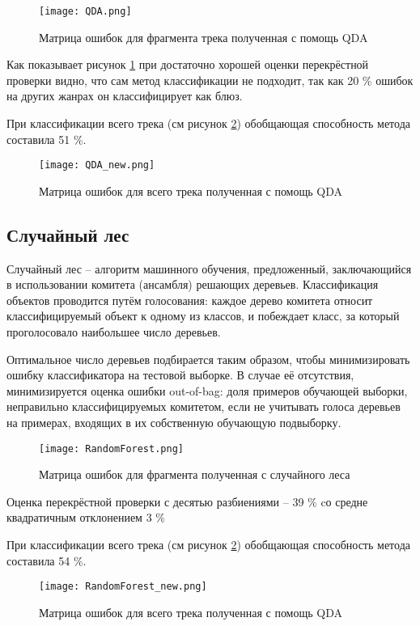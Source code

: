 \begin{figure}[h]
\centering
  \texttt{[image: QDA.png]}
  \caption{Матрица ошибок для фрагмента трека полученная с помощь QDA}
  \label{fig:results:QDA}
\end{figure}

Как показывает рисунок \ref{fig:results:QDA} при достаточно хорошей оценки перекрёстной проверки видно, что сам метод классификации не подходит, так как 20 \% ошибок на других жанрах он классифицирует как блюз. 

При классификации всего трека (см рисунок \ref{fig:results:QDA_new}) обобщающая способность метода составила 51 \%. 
\begin{figure}[h]
\centering
  \texttt{[image: QDA\_new.png]}
  \caption{Матрица ошибок для всего трека полученная с помощь QDA}
  \label{fig:results:QDA_new}
\end{figure}


\subsection{Случайный лес}

Случайный лес -- алгоритм машинного обучения, предложенный, заключающийся в использовании комитета (ансамбля) решающих деревьев. Классификация объектов проводится путём голосования: каждое дерево комитета относит классифицируемый объект к одному из классов, и побеждает класс, за который проголосовало наибольшее число деревьев.

Оптимальное число деревьев подбирается таким образом, чтобы минимизировать ошибку классификатора на тестовой выборке. В случае её отсутствия, минимизируется оценка ошибки out-of-bag: доля примеров обучающей выборки, неправильно классифицируемых комитетом, если не учитывать голоса деревьев на примерах, входящих в их собственную обучающую подвыборку.

\begin{figure}[h]
\centering
  \texttt{[image: RandomForest.png]}
  \caption{Матрица ошибок для фрагмента полученная с случайного леса}
  \label{fig:results:RandomForest}
\end{figure}

Оценка перекрёстной проверки с десятью разбиениями -- 39 \% cо средне квадратичным отклонением 3 \%

При классификации всего трека (см рисунок \ref{fig:results:QDA_new}) обобщающая способность метода составила 54 \%. 
\begin{figure}[h]
\centering
  \texttt{[image: RandomForest\_new.png]}
  \caption{Матрица ошибок  для всего трека полученная с помощь QDA}
  \label{fig:results:RandomForest_new}
\end{figure}


